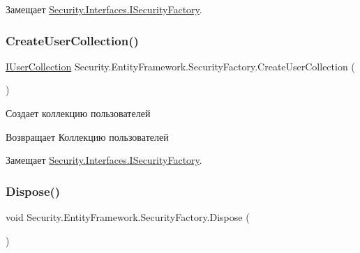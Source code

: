 Замещает \hyperlink{interface_security_1_1_interfaces_1_1_i_security_factory_acf1eb07cd7264db66304340e9196b2af}{Security.\+Interfaces.\+I\+Security\+Factory}.

\mbox{\label{class_security_1_1_entity_framework_1_1_security_factory_a9b16e937fcec0adc84622f5823d83a30}} 
\subsubsection{\texorpdfstring{Create\+User\+Collection()}{CreateUserCollection()}}
{\footnotesize\ttfamily \hyperlink{interface_security_1_1_interfaces_1_1_collections_1_1_i_user_collection}{I\+User\+Collection} Security.\+Entity\+Framework.\+Security\+Factory.\+Create\+User\+Collection (\begin{DoxyParamCaption}{ }\end{DoxyParamCaption})}



Создает коллекцию пользователей 

\begin{DoxyReturn}{Возвращает}
Коллекцию пользователей
\end{DoxyReturn}


Замещает \hyperlink{interface_security_1_1_interfaces_1_1_i_security_factory_af7bc3e5089a1611eea69ea5c4c8735c9}{Security.\+Interfaces.\+I\+Security\+Factory}.

\mbox{\label{class_security_1_1_entity_framework_1_1_security_factory_a2c2ceec2782dd947137009027aace70b}} 
\subsubsection{\texorpdfstring{Dispose()}{Dispose()}}
{\footnotesize\ttfamily void Security.\+Entity\+Framework.\+Security\+Factory.\+Dispose (\begin{DoxyParamCaption}{ }\end{DoxyParamCaption})}



